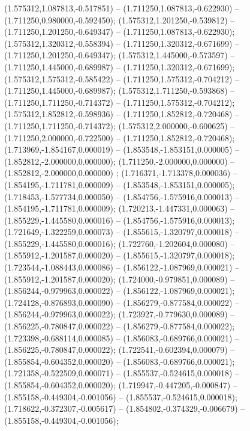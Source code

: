  (1.575312,1.087813,-0.517851) -- (1.711250,1.087813,-0.622930) -- (1.711250,0.980000,-0.592450);
 (1.575312,1.201250,-0.539812) -- (1.711250,1.201250,-0.649347) -- (1.711250,1.087813,-0.622930);
 (1.575312,1.320312,-0.558394) -- (1.711250,1.320312,-0.671699) -- (1.711250,1.201250,-0.649347);
 (1.575312,1.445000,-0.573597) -- (1.711250,1.445000,-0.689987) -- (1.711250,1.320312,-0.671699);
 (1.575312,1.575312,-0.585422) -- (1.711250,1.575312,-0.704212) -- (1.711250,1.445000,-0.689987);
 (1.575312,1.711250,-0.593868) -- (1.711250,1.711250,-0.714372) -- (1.711250,1.575312,-0.704212);
 (1.575312,1.852812,-0.598936) -- (1.711250,1.852812,-0.720468) -- (1.711250,1.711250,-0.714372);
 (1.575312,2.000000,-0.600625) -- (1.711250,2.000000,-0.722500) -- (1.711250,1.852812,-0.720468);
 (1.713969,-1.854167,0.000019) -- (1.853548,-1.853151,0.000005) -- (1.852812,-2.000000,0.000000);
 (1.711250,-2.000000,0.000000) -- (1.852812,-2.000000,0.000000) ;
 (1.716371,-1.713378,0.000036) -- (1.854195,-1.711781,0.000009) -- (1.853548,-1.853151,0.000005);
 (1.718453,-1.577734,0.000050) -- (1.854756,-1.575916,0.000013) -- (1.854195,-1.711781,0.000009);
 (1.720213,-1.447331,0.000063) -- (1.855229,-1.445580,0.000016) -- (1.854756,-1.575916,0.000013);
 (1.721649,-1.322259,0.000073) -- (1.855615,-1.320797,0.000018) -- (1.855229,-1.445580,0.000016);
 (1.722760,-1.202604,0.000080) -- (1.855912,-1.201587,0.000020) -- (1.855615,-1.320797,0.000018);
 (1.723544,-1.088443,0.000086) -- (1.856122,-1.087969,0.000021) -- (1.855912,-1.201587,0.000020);
 (1.724000,-0.979851,0.000089) -- (1.856244,-0.979963,0.000022) -- (1.856122,-1.087969,0.000021);
 (1.724128,-0.876893,0.000090) -- (1.856279,-0.877584,0.000022) -- (1.856244,-0.979963,0.000022);
 (1.723927,-0.779630,0.000089) -- (1.856225,-0.780847,0.000022) -- (1.856279,-0.877584,0.000022);
 (1.723398,-0.688114,0.000085) -- (1.856083,-0.689766,0.000021) -- (1.856225,-0.780847,0.000022);
 (1.722541,-0.602394,0.000079) -- (1.855854,-0.604352,0.000020) -- (1.856083,-0.689766,0.000021);
 (1.721358,-0.522509,0.000071) -- (1.855537,-0.524615,0.000018) -- (1.855854,-0.604352,0.000020);
 (1.719947,-0.447205,-0.000847) -- (1.855158,-0.449304,-0.001056) -- (1.855537,-0.524615,0.000018);
 (1.718622,-0.372307,-0.005617) -- (1.854802,-0.374329,-0.006679) -- (1.855158,-0.449304,-0.001056);
